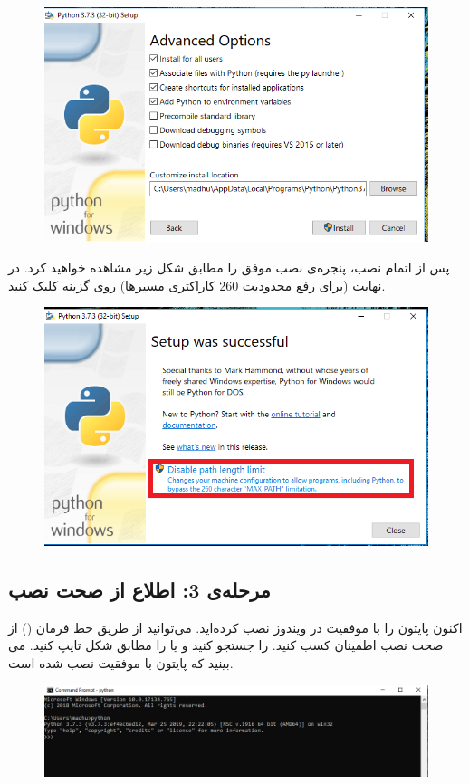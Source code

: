 \documentclass{article}
\begin{document}
\begin{figure}[H]
    \centering
    \includegraphics[width=1.0\textwidth]{figures/4.png}
    \caption
	{}
    \label{fig:fig1}
\end{figure}
پس از اتمام نصب، پنجره‌ی نصب موفق  را مطابق شکل زیر مشاهده خواهید کرد. در نهایت (برای رفع محدودیت 260 کاراکتری مسیرها) روی گزینه  کلیک کنید.
\begin{figure}[H]
    \centering
    \includegraphics[width=1.0\textwidth]{figures/5.png}
    \caption
	{}
    \label{fig:fig1}
\end{figure}

\subsection{مرحله‌ی 3: اطلاع از صحت نصب }
اکنون پایتون را با موفقیت در ویندوز نصب کرده‌اید. می‌توانید از طریق خط فرمان () از صحت نصب  اطمینان کسب کنید.  را جستجو کنید و  یا  را مطابق شکل تایپ کنید. می بینید که پایتون با موفقیت نصب شده است.
\begin{figure}[H]
    \centering
    \includegraphics[width=1.0\textwidth]{figures/6.png}
    \caption
	{}
    \label{fig:fig1}
\end{figure}
\end{document}
